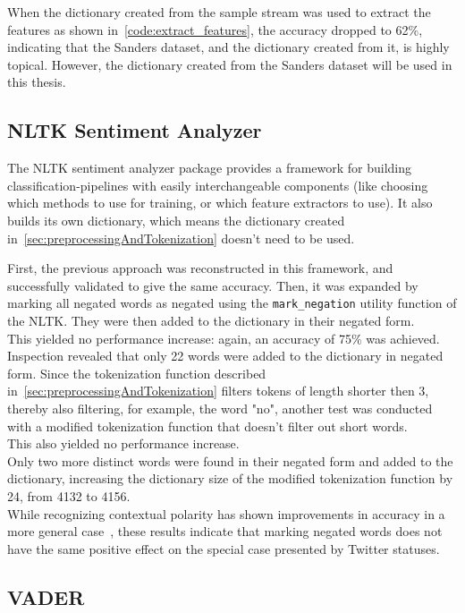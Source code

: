 When the dictionary created from the sample stream was used to extract the features as shown in~\cref{code:extract_features},
the accuracy dropped to 62\%, indicating that the Sanders dataset, and the dictionary created from it, is highly topical.
However, the dictionary created from the Sanders dataset will be used in this thesis.

\subsection{NLTK Sentiment Analyzer}
\label{subsec:nltksentimentanalyzer}

The NLTK sentiment analyzer package provides a framework for building classification-pipelines with easily interchangeable components
(like choosing which methods to use for training, or which feature extractors to use).
It also builds its own dictionary, which means the dictionary created in~\cref{sec:preprocessingAndTokenization} doesn't need to be used.

First, the previous approach was reconstructed in this framework, and successfully validated to give the same accuracy.
Then, it was expanded by marking all negated words as negated using the \texttt{mark\_negation} utility function of the NLTK.
They were then added to the dictionary in their negated form.
\\
This yielded no performance increase: again, an accuracy of 75\% was achieved.
\\
Inspection revealed that only 22 words were added to the dictionary in negated form.
Since the tokenization function described in~\cref{sec:preprocessingAndTokenization} filters tokens of length shorter then 3,
thereby also filtering, for example, the word "no", another test was conducted with a modified tokenization function that doesn't filter out short words.
\\
This also yielded no performance increase.
\\
Only two more distinct words were found in their negated form and added to the dictionary,
increasing the dictionary size of the modified tokenization function by 24, from 4132 to 4156.
\\
While recognizing contextual polarity has shown improvements in accuracy in a more general case~\cite{Hoffmann2005},
these results indicate that marking negated words does not have the same positive effect on the special case presented by Twitter statuses.

\subsection{VADER}
\label{subsec:vader}


